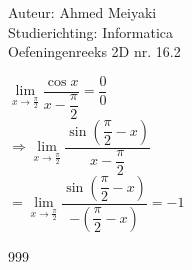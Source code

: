 \documentclass[a4paper]{article}
\begin{document}
  
\noindent \large Auteur: Ahmed Meiyaki \\
\noindent \large Studierichting: Informatica\\
\noindent \large Oefeningenreeks 2D nr. 16.2\\

\medskip

\normalsize

$\lim\limits_{x \rightarrow \tfrac{\pi}{2}} \dfrac{\cos x}{x - \dfrac{\pi}{2}} = \dfrac{0}{0} $\\

$\Rightarrow \lim\limits_{x \rightarrow \tfrac{\pi}{2}} \dfrac{\sin\left(\dfrac{\pi}{2} - x\right)}{x - \dfrac{\pi}{2}} $\\

$=\lim\limits_{x \rightarrow \tfrac{\pi}{2}} \dfrac{\sin\left(\dfrac{\pi}{2} - x\right)}{-\left(\dfrac{\pi}{2} - x\right)} = -1 $\\



\begin{thebibliography}{999}
\end{thebibliography}
\end{document}
